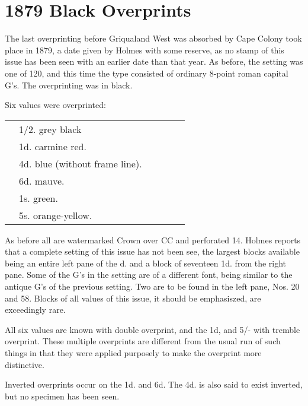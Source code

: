 \chapter{1879 Black Overprints}    
The last overprinting before Griqualand West was absorbed by Cape Colony took place
in 1879, a date given by Holmes with some reserve, as no stamp of this issue has been seen with an earlier date than that year. As before, the setting was one of 120, and this time the type consisted of ordinary 8-point roman capital G's. The overprinting was in black.

Six values were overprinted:

\begin{tabular}{llllll}
 &1/2. grey black & & & &\\
 &1d. carmine red.& & & &\\
 &4d. blue (without frame line).& & & &\\
 &6d. mauve.& & & &\\
 &1s. green.& & & &\\
 &5s. orange-yellow.& & & &\\
\end{tabular}

As before all are watermarked Crown over CC and perforated 14. Holmes reports that a complete setting of this issue has not been see, the largest blocks available being an entire left pane of the \half d. and a block of seventeen 1d. from the right pane. Some of the G's in the setting are of a different font, being similar to the antique G's of the previous setting. Two are to be found in the left pane, Nos. 20 and 58. Blocks of all values of this issue, it should be emphasiszed, are exceedingly rare.

All six values are known with double overprint, and the 1d, and 5/- with tremble overprint. These multiple overprints are different from the usual run of such things in that they were applied purposely to make the overprint more distinctive.


Inverted overprints occur on the 1d. and 6d. The 4d. is also said to exist inverted, but no specimen has been seen.




          